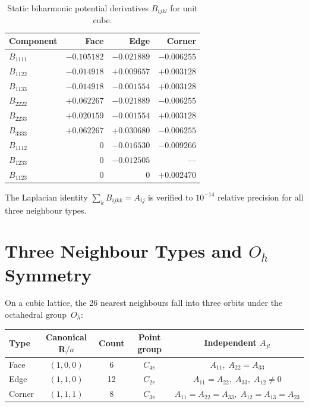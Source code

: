 \documentclass[11pt,a4paper]{article}
\newcommand{\bR}{\bm{R}}
\theoremstyle{plain}
\theoremstyle{remark}
\begin{document}
\begin{table}[ht]
\centering
\caption{Static biharmonic potential derivatives $B_{ijkl}$ for unit cube.}
\label{tab:static-B}
\begin{tabular}{l*{3}{r}}
\toprule
Component & Face & Edge & Corner \\
\midrule
$B_{1111}$ & $-0.105182$ & $-0.021889$ & $-0.006255$ \\
$B_{1122}$ & $-0.014918$ & $+0.009657$ & $+0.003128$ \\
$B_{1133}$ & $-0.014918$ & $-0.001554$ & $+0.003128$ \\
$B_{2222}$ & $+0.062267$ & $-0.021889$ & $-0.006255$ \\
$B_{2233}$ & $+0.020159$ & $-0.001554$ & $+0.003128$ \\
$B_{3333}$ & $+0.062267$ & $+0.030680$ & $-0.006255$ \\
$B_{1112}$ & $0$ & $-0.016530$ & $-0.009266$ \\
$B_{1233}$ & $0$ & $-0.012505$ & --- \\
$B_{1123}$ & $0$ & $0$ & $+0.002470$ \\
\bottomrule
\end{tabular}
\end{table}

The Laplacian identity $\sum_k B_{ijkk} = A_{ij}$ is verified to
$10^{-14}$ relative precision for all three neighbour types.


\section{Three Neighbour Types and $O_h$ Symmetry}
\label{sec:neighbours}

On a cubic lattice, the 26 nearest neighbours fall into three orbits
under the octahedral group~$O_h$:

\begin{center}
\begin{tabular}{lcccc}
\toprule
Type & Canonical $\bR/a$ & Count & Point group & Independent $A_{jl}$ \\
\midrule
Face   & $(1,0,0)$ & 6  & $C_{4v}$ & $A_{11},\; A_{22}=A_{33}$ \\
Edge   & $(1,1,0)$ & 12 & $C_{2v}$ & $A_{11}=A_{22},\; A_{33},\; A_{12}\neq 0$ \\
Corner & $(1,1,1)$ & 8  & $C_{3v}$ & $A_{11}=A_{22}=A_{33},\; A_{12}=A_{13}=A_{23}$ \\
\bottomrule
\end{tabular}
\end{center}
\end{document}
